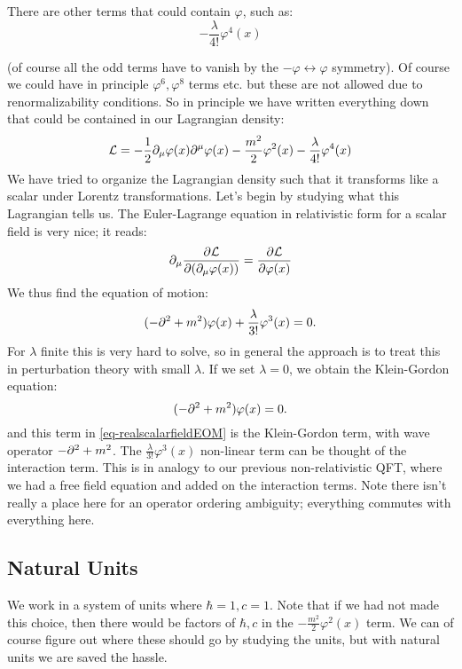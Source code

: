 There are other terms that could contain $\varphi$, such as:
\begin{equation}
    -\frac{\lambda}{4!}\varphi^4(x)
\end{equation}

(of course all the odd terms have to vanish by the $-\varphi \leftrightarrow \varphi$ symmetry). Of course we could have in principle $\varphi^6, \varphi^8$ terms etc. but these are not allowed due to renormalizability conditions. So in principle we have written everything down that could be contained in our Lagrangian density:
\begin{equation}
    \L = -\frac{1}{2}\p_\mu \varphi(x) \p^\mu \varphi(x) - \frac{m^2}{2}\varphi^2(x) - \frac{\lambda}{4!}\varphi^4(x)
\end{equation}
We have tried to organize the Lagrangian density such that it transforms like a scalar under Lorentz transformations. Let's begin by studying what this Lagrangian tells us. The Euler-Lagrange equation in relativistic form for a scalar field is very nice; it reads:
\begin{equation}
    \p_\mu \dpd{\L}{(\p_\mu \varphi(x))} = \dpd{\L}{\varphi(x)}
\end{equation}
We thus find the equation of motion:
\begin{equation}\label{eq-realscalarfieldEOM}
    (-\p^2 + m^2)\varphi(x) + \frac{\lambda}{3!}\varphi^3(x) = 0.
\end{equation}
For $\lambda$ finite this is very hard to solve, so in general the approach is to treat this in perturbation theory with small $\lambda$. If we set $\lambda = 0$, we obtain the Klein-Gordon equation:
\begin{equation}
    (-\p^2 + m^2)\varphi(x) = 0.
\end{equation}
and this term in \eqref{eq-realscalarfieldEOM} is the Klein-Gordon term, with wave operator $-\partial^2 + m^2$. The $\frac{\lambda}{3!}\varphi^3(x)$ non-linear term can be thought of the interaction term. This is in analogy to our previous non-relativistic QFT, where we had a free field equation and added on the interaction terms. Note there isn't really a place here for an operator ordering ambiguity; everything commutes with everything here. 

\subsection{Natural Units}
We work in a system of units where $\hbar = 1, c = 1$. Note that if we had not made this choice, then there would be factors of $\hbar, c$ in the $- \frac{m^2}{2}\varphi^2(x)$ term. We can of course figure out where these should go by studying the units, but with natural units we are saved the hassle.

